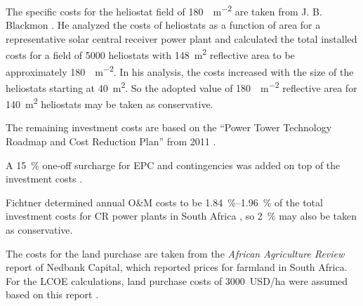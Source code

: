 The specific costs for the heliostat field of \SI{180}{\usd\per\square\metre} are taken from J. B. Blackmon \cite{Blackmon2012}. He analyzed the costs of heliostats as a function of area for a representative solar central receiver power plant and calculated the total installed costs for a field of \num{5000} heliostats with \SI{148}{\square\metre} reflective area to be approximately \SI{180}{\usd\per\square\metre}. In his analysis, the costs increased with the size of the heliostats starting at \SI{40}{\square\metre}. So the adopted value of \SI{180}{\usd\per\square\metre} reflective area for \SI{140}{\square\metre} heliostats may be taken as conservative.

The remaining investment costs are based on the \enquote{Power Tower Technology Roadmap and Cost Reduction Plan} from 2011 \cite{Kolb2011}.

A \SI{15}{\percent} one-off surcharge for EPC and contingencies was added on top of the investment costs \cite{Platzer2014}.

Fichtner determined annual O\&M costs to be \SIrange{1.84}{1.96}{\percent} of the total investment costs for CR power plants in South Africa \cite{Fichtner2010}, so \SI{2}{\percent} may also be taken as conservative.

The costs for the land purchase are taken from the \emph{African Agriculture Review} report of Nedbank Capital, which reported prices for farmland in South Africa. For the LCOE calculations, land purchase costs of \SI{3000}{USD/\hectare} were assumed based on this report \cite{Cassell2012}.


